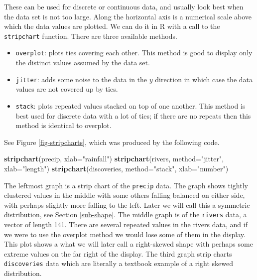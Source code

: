 \documentclass[]{book}
\newenvironment{Shaded}{\begin{snugshade}}{\end{snugshade}}
\newcommand{\KeywordTok}[1]{\textcolor[rgb]{0.13,0.29,0.53}{\textbf{{#1}}}}
\newcommand{\DataTypeTok}[1]{\textcolor[rgb]{0.13,0.29,0.53}{{#1}}}
\newcommand{\StringTok}[1]{\textcolor[rgb]{0.31,0.60,0.02}{{#1}}}
\newcommand{\NormalTok}[1]{{#1}}
\providecommand{\tightlist}{%
  \setlength{\itemsep}{0pt}\setlength{\parskip}{0pt}}
\numberwithin{equation}{chapter}
\numberwithin{figure}{chapter}
\theoremstyle{plain}
\theoremstyle{definition}
\theoremstyle{remark}
\theoremstyle{definition}
\theoremstyle{definition}
\theoremstyle{remark}
\begin{document}
 

These can be used for discrete or continuous data, and usually look best
when the data set is not too large. Along the horizontal axis is a
numerical scale above which the data values are plotted. We can do it in
R with a call to the \texttt{stripchart}
 function. There are three
available methods.

\begin{itemize}
\tightlist
\item
  \texttt{overplot}: plots ties covering each other. This method is good
  to display only the distinct values assumed by the data set.
\item
  \texttt{jitter}: adds some noise to the data in the \(y\) direction in
  which case the data values are not covered up by ties.
\item
  \texttt{stack}: plots repeated values stacked on top of one another.
  This method is best used for discrete data with a lot of ties; if
  there are no repeats then this method is identical to overplot.
\end{itemize}

See Figure \ref{fig-stripcharts}, which was produced by the following
code.

\begin{Shaded}
\begin{Highlighting}[]
\KeywordTok{stripchart}\NormalTok{(precip, }\DataTypeTok{xlab=}\StringTok{"rainfall"}\NormalTok{)}
\KeywordTok{stripchart}\NormalTok{(rivers, }\DataTypeTok{method=}\StringTok{"jitter"}\NormalTok{, }\DataTypeTok{xlab=}\StringTok{"length"}\NormalTok{)}
\KeywordTok{stripchart}\NormalTok{(discoveries, }\DataTypeTok{method=}\StringTok{"stack"}\NormalTok{, }\DataTypeTok{xlab=}\StringTok{"number"}\NormalTok{)}
\end{Highlighting}
\end{Shaded}

The leftmost graph is a strip chart of the \texttt{precip} data. The
graph shows tightly clustered values in the middle with some others
falling balanced on either side, with perhaps slightly more falling to
the left. Later we will call this a symmetric distribution, see Section
\ref{sub-shape}. The middle graph is of the \texttt{rivers} data, a
vector of length 141. There are several repeated values in the rivers
data, and if we were to use the overplot method we would lose some of
them in the display. This plot shows a what we will later call a
right-skewed shape with perhaps some extreme values on the far right of
the display. The third graph strip charts \texttt{discoveries} data
which are literally a textbook example of a right skewed distribution.
\end{document}
